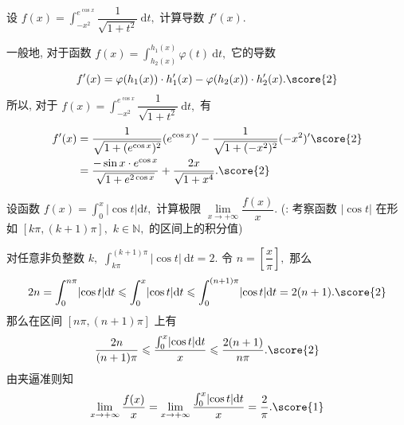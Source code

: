 \begin{question}[points = 6]
设 $\displaystyle f(x) = \int_{-x^2}^{e^{\cos x}} \dfrac{1}{\sqrt{1 + t^2}} ~ \mathrm{d}t,$ 计算导数 $f'(x).$

\end{question}

\begin{solution}
一般地, 对于函数 $\displaystyle f(x) = \int_{h_2(x)}^{h_1(x)} \varphi(t) ~ \mathrm{d}t,$ 它的导数
\begin{equation*}
f'(x) = \varphi(h_1(x)) \cdot h_1'(x) - \varphi(h_2(x)) \cdot h_2'(x). \score{2}
\end{equation*}
所以, 对于 $\displaystyle f(x) = \int_{-x^2}^{e^{\cos x}} \dfrac{1}{\sqrt{1 + t^2}} ~ \mathrm{d}t,$ 有
\begin{align*}
f'(x) & = \dfrac{1}{\sqrt{1 + (e^{\cos x})^2}}(e^{\cos x})' - \dfrac{1}{\sqrt{1 + (-x^2)^2}} (-x^2)' \score{2} \\
& = \dfrac{-\sin x \cdot e^{\cos x}}{\sqrt{1 + e^{2\cos x}}} + \dfrac{2x}{\sqrt{1 + x^4}}. \score{2}
\end{align*}
\end{solution}


\begin{question}[points = 6]
设函数 $f(x) = \int_0^x \lvert \cos t \rvert \mathrm{d} t,$ 计算极限 $\lim\limits_{x\to+\infty} \dfrac{f(x)}{x}.$\newline
(: 考察函数 $\lvert \cos t \rvert$ 在形如 $[k\pi, (k+1)\pi],$ $k \in \mathbb{N},$ 的区间上的积分值)

\end{question}

\begin{solution}
对任意非负整数 $k,$ $\int_{k\pi}^{(k+1)\pi} \lvert \cos t \rvert ~ \mathrm{d} t = 2.$ 
令 $n = \left[ \dfrac{x}{\pi} \right],$ 那么
\begin{equation*}
2n = \int_0^{n\pi} \lvert \cos t \rvert \mathrm{d} t \leqslant \int_0^x \lvert \cos t \rvert \mathrm{d} t \leqslant \int_0^{(n+1)\pi} \lvert \cos t \rvert \mathrm{d} t = 2(n+1). \score{2}
\end{equation*}
那么在区间 $[n\pi, (n+1)\pi]$ 上有
\begin{equation*}
\dfrac{2n}{(n+1)\pi} \leqslant \dfrac{\int_0^x \lvert \cos t \rvert \mathrm{d} t}{x} \leqslant \dfrac{2(n+1)}{n\pi}. \score{2}
\end{equation*}
由夹逼准则知
\begin{equation*}
\lim\limits_{x\to+\infty} \dfrac{f(x)}{x} = \lim\limits_{x\to+\infty} \dfrac{\int_0^x \lvert \cos t \rvert \mathrm{d} t}{x} = \dfrac{2}{\pi}. \score{1}
\end{equation*}
\end{solution}


